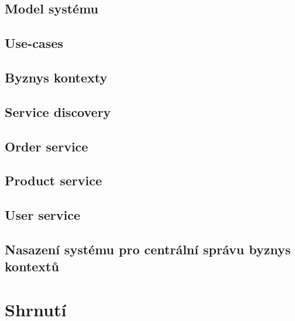 \subsection{Model systému}

\subsection{Use-cases}

\subsection{Byznys kontexty}

\subsection{Service discovery}

\subsection{Order service}

\subsection{Product service}

\subsection{User service}

\subsection{Nasazení systému pro centrální správu byznys kontextů}

\section{Shrnutí}
